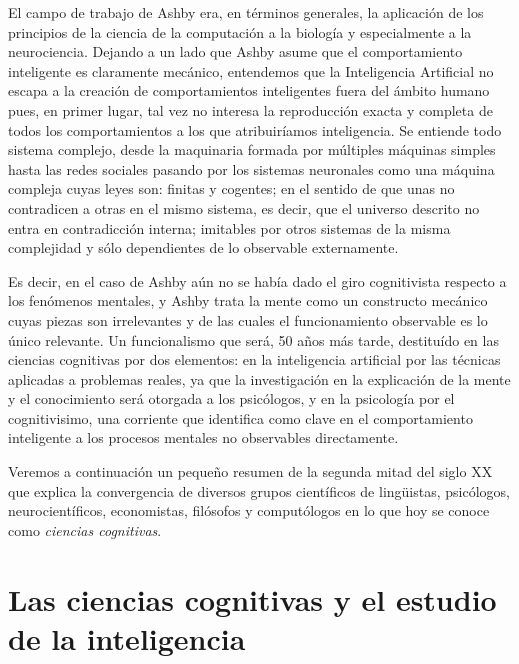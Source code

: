 \documentclass[12pt]{memoir}
\begin{document}
El campo de trabajo de Ashby era, en términos generales, la aplicación de los principios de la ciencia de la computación a la biología y especialmente a la neurociencia. Dejando a un lado que Ashby asume que el comportamiento inteligente es claramente mecánico, entendemos que la Inteligencia Artificial no escapa a la creación de comportamientos inteligentes fuera del ámbito humano pues, en primer lugar, tal vez no interesa la reproducción exacta y completa de todos los comportamientos a los que atribuiríamos inteligencia. Se entiende todo sistema complejo, desde la maquinaria formada por múltiples máquinas simples hasta las redes sociales pasando por los sistemas neuronales como una máquina compleja cuyas leyes son: finitas y cogentes; en el sentido de que unas no contradicen a otras en el mismo sistema, es decir, que el universo descrito no entra en contradicción interna; imitables por otros sistemas de la misma complejidad y sólo dependientes de lo observable externamente.
 
Es decir, en el caso de Ashby aún no se había dado el giro cognitivista respecto a los fenómenos mentales, y Ashby trata la mente como un constructo mecánico cuyas piezas son irrelevantes y de las cuales el funcionamiento observable es lo único relevante. Un funcionalismo que será, 50 años más tarde, destituído en las ciencias cognitivas por dos elementos: en la inteligencia artificial por las técnicas aplicadas a problemas reales, ya que la investigación en la explicación de la mente y el conocimiento será otorgada a los psicólogos, y en la psicología por el cognitivisimo, una corriente que identifica como clave en el comportamiento inteligente a los procesos mentales no observables directamente. 

Veremos a continuación un pequeño resumen de la segunda mitad del siglo XX que explica la convergencia de diversos grupos científicos de lingüistas, psicólogos, neurocientíficos, economistas, filósofos y computólogos en lo que hoy se conoce como \textit{ciencias cognitivas}.

\section{Las ciencias cognitivas y el estudio de la inteligencia}
\end{document}
